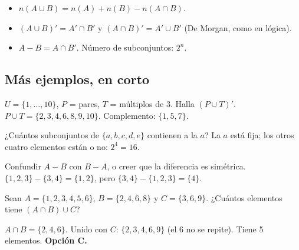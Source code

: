 \begin{regla}
\begin{itemize}
  \item $n(A \cup B) = n(A) + n(B) - n(A \cap B)$.
  \item $(A \cup B)' = A' \cap B'$ y $(A \cap B)' = A' \cup B'$ (De Morgan, como en lógica).
  \item $A - B = A \cap B'$. Número de subconjuntos: $2^n$.
\end{itemize}
\end{regla}

\subsection{Más ejemplos, en corto}
\begin{ejemplo}
$U = \{1, \ldots, 10\}$, $P$ = pares, $T$ = múltiplos de 3. Halla $(P \cup T)'$.
\solucion $P \cup T = \{2, 3, 4, 6, 8, 9, 10\}$. Complemento: $\{1, 5, 7\}$.
\end{ejemplo}

\begin{ejemplo}
¿Cuántos subconjuntos de $\{a, b, c, d, e\}$ contienen a la $a$?
\solucion La $a$ está fija; los otros cuatro elementos están o no: $2^4 = 16$.
\end{ejemplo}

\begin{trampa}
Confundir $A - B$ con $B - A$, o creer que la diferencia es simétrica. $\{1, 2, 3\} - \{3, 4\} = \{1, 2\}$, pero
$\{3, 4\} - \{1, 2, 3\} = \{4\}$.
\end{trampa}

\begin{reto}
Sean $A = \{1, 2, 3, 4, 5, 6\}$, $B = \{2, 4, 6, 8\}$ y $C = \{3, 6, 9\}$. ¿Cuántos elementos tiene $(A \cap B) \cup C$?
\end{reto}

\begin{retoresuelto}
$A \cap B = \{2, 4, 6\}$. Unido con $C$: $\{2, 3, 4, 6, 9\}$ (el 6 no se repite). Tiene 5 elementos. \textbf{Opción C.}
\end{retoresuelto}


